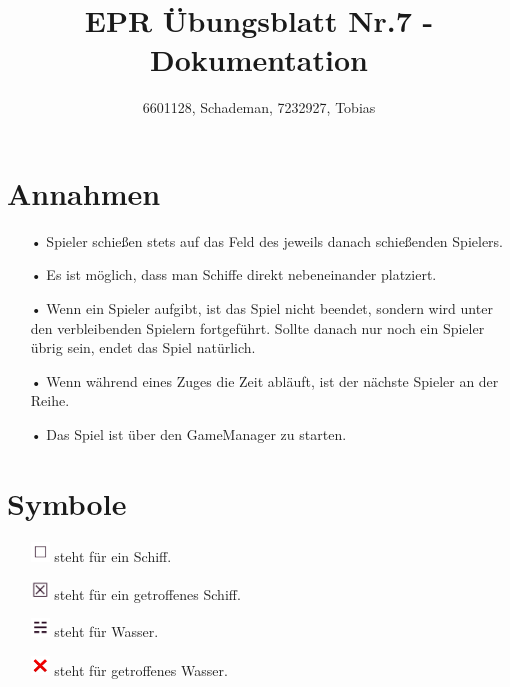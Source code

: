 \documentclass[11pt,a4paper]{article}
\begin{document}
\title{EPR Übungsblatt Nr.7 - Dokumentation}
\author{6601128, Schademan, 7232927, Tobias}
\maketitle

\section*{Annahmen}
\begin{enumerate}
\item[•] Spieler schießen stets auf das Feld des jeweils danach schießenden Spielers.
\item[•] Es ist möglich, dass man Schiffe direkt nebeneinander platziert.
\item[•] Wenn ein Spieler aufgibt, ist das Spiel nicht beendet, sondern wird unter den verbleibenden Spielern fortgeführt. Sollte danach nur noch ein Spieler übrig sein, endet das Spiel natürlich.
\item[•] Wenn während eines Zuges die Zeit abläuft, ist der nächste Spieler an der Reihe.
\item[•] Das Spiel ist über den GameManager zu starten.
\end{enumerate}

\section*{Symbole}
\begin{enumerate}
\item[]\includegraphics[width=5mm]{ship.PNG} steht für ein Schiff.
\item[]\includegraphics[width=5mm]{ship_hit.PNG} steht für ein getroffenes Schiff.
\item[]\includegraphics[width=5mm]{water.PNG} steht für Wasser.
\item[]\includegraphics[width=5mm]{water_hit.PNG} steht für getroffenes Wasser.
\end{enumerate}
\end{document}
